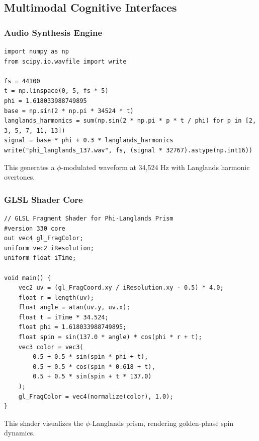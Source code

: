 \documentclass[12pt]{article}
\begin{document}
\subsection{Multimodal Cognitive Interfaces}
\subsubsection{Audio Synthesis Engine}
\begin{lstlisting}
import numpy as np
from scipy.io.wavfile import write

fs = 44100
t = np.linspace(0, 5, fs * 5)
phi = 1.618033988749895
base = np.sin(2 * np.pi * 34524 * t)
langlands_harmonics = sum(np.sin(2 * np.pi * p * t / phi) for p in [2, 3, 5, 7, 11, 13])
signal = base * phi + 0.3 * langlands_harmonics
write("phi_langlands_137.wav", fs, (signal * 32767).astype(np.int16))
\end{lstlisting}
This generates a $\phi$-modulated waveform at 34,524 Hz with Langlands harmonic overtones.

\subsubsection{GLSL Shader Core}
\begin{lstlisting}
// GLSL Fragment Shader for Phi-Langlands Prism
#version 330 core
out vec4 gl_FragColor;
uniform vec2 iResolution;
uniform float iTime;

void main() {
    vec2 uv = (gl_FragCoord.xy / iResolution.xy - 0.5) * 4.0;
    float r = length(uv);
    float angle = atan(uv.y, uv.x);
    float t = iTime * 34.524;
    float phi = 1.618033988749895;
    float spin = sin(137.0 * angle) * cos(phi * r + t);
    vec3 color = vec3(
        0.5 + 0.5 * sin(spin * phi + t),
        0.5 + 0.5 * cos(spin * 0.618 + t),
        0.5 + 0.5 * sin(spin + t * 137.0)
    );
    gl_FragColor = vec4(normalize(color), 1.0);
}
\end{lstlisting}
This shader visualizes the $\phi$-Langlands prism, rendering golden-phase spin dynamics.

\end{document}
